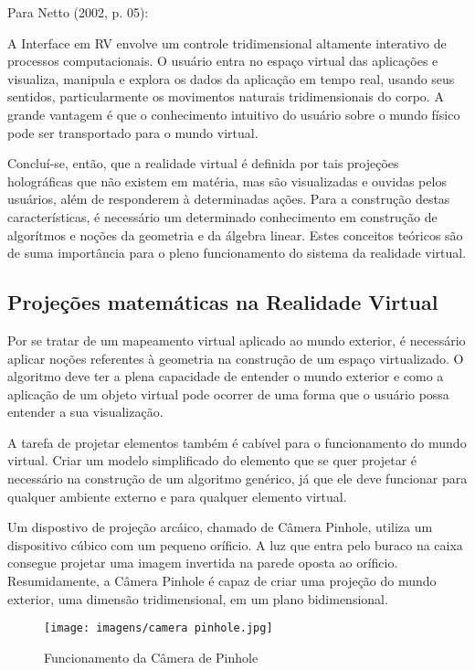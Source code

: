 \documentclass[a4paper, 10pt]{article}
\begin{document}
Para Netto (2002, p. 05):

\begin{adjustwidth}{0.4\textwidth}{}
A Interface em RV envolve um controle tridimensional altamente interativo de processos computacionais. O usuário entra no espaço virtual das aplicações e visualiza, manipula e explora os dados da aplicação em tempo real, usando seus sentidos, particularmente os movimentos naturais tridimensionais do corpo. A grande vantagem é que o conhecimento intuitivo do usuário sobre o mundo físico pode ser transportado para o mundo virtual. \citep{netto2002}

\end{adjustwidth}

Concluí-se, então, que a realidade virtual é definida por tais projeções holográficas que não existem em matéria, mas são visualizadas e ouvidas pelos usuários, além de responderem à determinadas ações.
Para a construção destas características, é necessário um determinado conhecimento em construção de algorítmos e noções da geometria e da álgebra linear. Estes conceitos teóricos são de suma importância para o pleno funcionamento do sistema da realidade virtual. 
\subsection{Projeções matemáticas na Realidade Virtual}
Por se tratar de um mapeamento virtual aplicado ao mundo exterior, é necessário aplicar noções referentes à geometria na construção de um espaço virtualizado. O algoritmo deve ter a plena capacidade de entender o mundo exterior e como a aplicação de um objeto virtual pode ocorrer de uma forma que o usuário possa entender a sua visualização.

A tarefa de projetar elementos também é cabível para o funcionamento do mundo virtual. Criar um modelo simplificado do elemento que se quer projetar é necessário na construção de um algoritmo genérico, já que ele deve funcionar para qualquer ambiente externo e para qualquer elemento virtual. 

Um dispostivo de projeção arcáico, chamado de Câmera Pinhole, utiliza um dispositivo cúbico com um pequeno oríficio. A luz que entra pelo buraco na caixa consegue projetar uma imagem invertida na parede oposta ao oríficio. Resumidamente, a Câmera Pinhole é capaz de criar uma projeção do mundo exterior, uma dimensão tridimensional, em um plano bidimensional. 

\begin{figure}[h!]
    \centering
    \texttt{[image: imagens/camera pinhole.jpg]}
    \caption{Funcionamento da Câmera de Pinhole}
    \label{fig:my_label}
    \citep{campin}
\end{figure}
\end{document}

